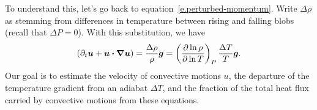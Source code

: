 To understand this, let's go back to equation~\ref{e.perturbed-momentum}.  Write $\Delta\rho$ as stemming from differences in temperature between rising and falling blobs (recall that $\Delta P=0$).   With this substitution, we have
\begin{equation}\label{e.perturbed-navier-stokes}
 (\partial_{t}\bm{u} + \bm{u}\bm{\cdot}\bm{\nabla}\bm{u}) = \frac{\Delta\rho}{\rho}\bm{g} = \left(\frac{\partial\ln\rho}{\partial\ln T}\right)_{P}\frac{\Delta T}{T}\bm{g}.
 \end{equation}
Our goal is to estimate the velocity of convective motions $u$, the departure of the temperature gradient from an adiabat $\Delta T$, and the fraction of the total heat flux carried by convective motions from these equations.

